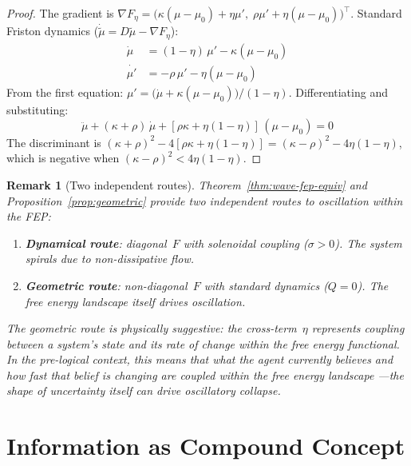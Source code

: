\documentclass[11pt,a4paper]{article}
\newtheorem{remark}[theorem]{Remark}
\begin{document}
\begin{proof}
The gradient is
$\nabla F_\eta = \bigl(\kappa(\mu{-}\mu_0) + \eta\mu',\;
\rho\mu' + \eta(\mu{-}\mu_0)\bigr)^\top$.
Standard Friston dynamics
($\dot{\tilde{\mu}} = D\tilde{\mu} - \nabla F_\eta$):
\begin{align}
\dot{\mu}  &= (1-\eta)\,\mu' - \kappa(\mu - \mu_0) \\
\dot{\mu'} &= -\rho\,\mu' - \eta(\mu - \mu_0)
\end{align}
From the first equation:
$\mu' = \bigl(\dot{\mu} + \kappa(\mu{-}\mu_0)\bigr)/(1-\eta)$.
Differentiating and substituting:
\[
\ddot{\mu} + (\kappa + \rho)\,\dot{\mu}
  + [\rho\kappa + \eta(1{-}\eta)]\,(\mu - \mu_0) = 0
\]
The discriminant is
$(\kappa{+}\rho)^2 - 4[\rho\kappa + \eta(1{-}\eta)]
= (\kappa{-}\rho)^2 - 4\eta(1{-}\eta)$, which is negative when
$(\kappa{-}\rho)^2 < 4\eta(1{-}\eta)$.
\end{proof}

\begin{remark}[Two independent routes]
\label{rem:two-routes}
Theorem~\ref{thm:wave-fep-equiv} and Proposition~\ref{prop:geometric}
provide two independent routes to oscillation within the FEP:
\begin{enumerate}[nosep]
\item \textbf{Dynamical route}: diagonal~$F$ with solenoidal coupling
  ($\sigma > 0$). The system spirals due to non-dissipative flow.
\item \textbf{Geometric route}: non-diagonal~$F$ with standard dynamics
  ($Q = 0$). The free energy landscape itself drives oscillation.
\end{enumerate}
The geometric route is physically suggestive: the cross-term~$\eta$
represents coupling between a system's state and its rate of change
within the free energy functional. In the pre-logical context, this
means that \emph{what the agent currently believes} and \emph{how fast
that belief is changing} are coupled within the free energy landscape
---the shape of uncertainty itself can drive oscillatory collapse.
\end{remark}

\section{Information as Compound Concept}
\label{sec:information}
\end{document}
